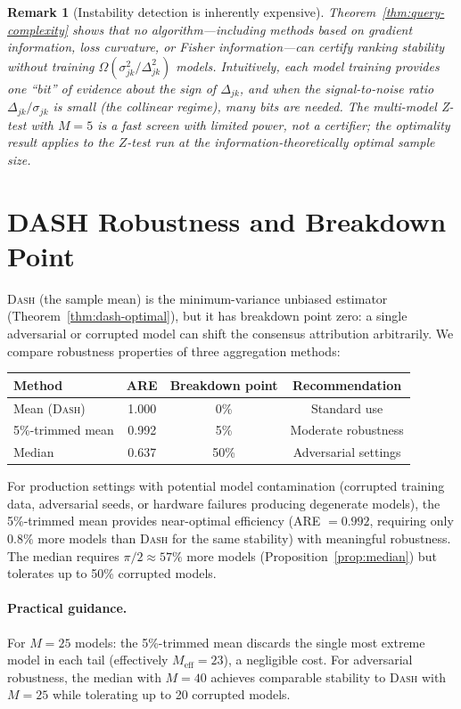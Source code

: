 \documentclass{article}
\newcommand{\DASH}{\textsc{Dash}}
\newtheorem{remark}[theorem]{Remark}
\begin{document}
\begin{remark}[Instability detection is inherently expensive]
Theorem~\ref{thm:query-complexity} shows that no algorithm---including
methods based on gradient information, loss curvature, or Fisher
information---can certify ranking stability without training
$\Omega(\sigma_{jk}^2/\Delta_{jk}^2)$ models.
Intuitively, each model training provides one ``bit'' of evidence about
the sign of $\Delta_{jk}$, and when the signal-to-noise ratio
$\Delta_{jk}/\sigma_{jk}$ is small (the collinear regime), many bits are
needed.
The multi-model Z-test with $M{=}5$ is a fast \emph{screen} with limited
power, not a certifier; the optimality result applies to the $Z$-test
run at the information-theoretically optimal sample size.
\end{remark}

\section{DASH Robustness and Breakdown Point}

\DASH{} (the sample mean) is the minimum-variance unbiased estimator
(Theorem~\ref{thm:dash-optimal}), but it has breakdown point zero:
a single adversarial or corrupted model can shift the consensus
attribution arbitrarily. We compare robustness properties of three
aggregation methods:

\begin{center}
\small
\begin{tabular}{@{}lccc@{}}
\toprule
Method & ARE & Breakdown point & Recommendation \\
\midrule
Mean (\DASH{}) & 1.000 & 0\% & Standard use \\
5\%-trimmed mean & 0.992 & 5\% & Moderate robustness \\
Median & 0.637 & 50\% & Adversarial settings \\
\bottomrule
\end{tabular}
\end{center}

For production settings with potential model contamination (corrupted
training data, adversarial seeds, or hardware failures producing
degenerate models), the 5\%-trimmed mean provides near-optimal
efficiency (ARE $= 0.992$, requiring only $0.8\%$ more models than
\DASH{} for the same stability) with meaningful robustness. The
median requires $\pi/2 \approx 57\%$ more models
(Proposition~\ref{prop:median}) but tolerates up to 50\% corrupted
models.

\paragraph{Practical guidance.}
For $M = 25$ models: the 5\%-trimmed mean discards the single most
extreme model in each tail (effectively $M_{\text{eff}} = 23$), a
negligible cost. For adversarial robustness, the median with
$M = 40$ achieves comparable stability to \DASH{} with $M = 25$
while tolerating up to 20 corrupted models.
\end{document}
